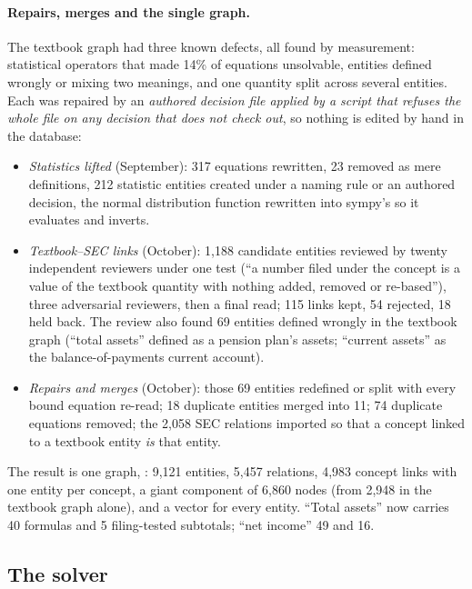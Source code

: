 \paragraph{Repairs, merges and the single graph.}
The textbook graph had three known defects, all found by measurement: statistical operators that made 14\% of equations unsolvable, entities defined wrongly or mixing two meanings, and one quantity split across several entities. Each was repaired by an \emph{authored decision file applied by a script that refuses the whole file on any decision that does not check out}, so nothing is edited by hand in the database:
\begin{itemize}
\item \emph{Statistics lifted} (September): 317 equations rewritten, 23 removed as mere definitions, 212 statistic entities created under a naming rule or an authored decision, the normal distribution function rewritten into sympy's  so it evaluates and inverts.
\item \emph{Textbook--SEC links} (October): 1,188 candidate entities reviewed by twenty independent reviewers under one test (``a number filed under the concept is a value of the textbook quantity with nothing added, removed or re-based''), three adversarial reviewers, then a final read; 115 links kept, 54 rejected, 18 held back. The review also found 69 entities defined wrongly in the textbook graph (``total assets'' defined as a pension plan's assets; ``current assets'' as the balance-of-payments current account).
\item \emph{Repairs and merges} (October): those 69 entities redefined or split with every bound equation re-read; 18 duplicate entities merged into 11; 74 duplicate equations removed; the 2,058 SEC relations imported so that a concept linked to a textbook entity \emph{is} that entity.
\end{itemize}
The result is one graph, : 9,121 entities, 5,457 relations, 4,983 concept links with one entity per concept, a giant component of 6,860 nodes (from 2,948 in the textbook graph alone), and a vector for every entity. ``Total assets'' now carries 40 formulas and 5 filing-tested subtotals; ``net income'' 49 and 16.

\subsection{The solver}
\label{sec:impl-solver}

